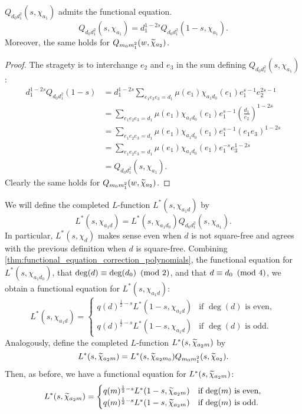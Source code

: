 \documentclass[12pt,reqno,oneside]{amsart}
\begin{document}
    \begin{theorem}\label{thm:functional_equation_correction_polynomials}
        $Q_{d_{0}d_{1}^{2}}(s,\chi_{a_{1}})$ admits the functional equation.
        \[
            Q_{d_{0}d_{1}^{2}}(s,\chi_{a_{1}}) = d_{1}^{1-2s}Q_{d_{0}d_{1}^{2}}(1-s,\chi_{a_{1}}).
        \]
        Moreover, the same holds for $Q_{m_{0}m_{1}^{2}}(w,\widetilde{\chi}_{a_{2}})$.
    \end{theorem}
    \begin{proof}
        The stragety is to interchange $e_{2}$ and $e_{3}$ in the sum defining $Q_{d_{0}d_{1}^{2}}(s,\chi_{a_{1}})$:
        \begin{align*}
            d_{1}^{1-2s}Q_{d_{0}d_{1}^{2}}(1-s) &= d_{1}^{1-2s}\sum_{e_{1}e_{2}e_{3} = d_{1}}\mu(e_{1})\chi_{a_{1}d_{0}}(e_{1})e_{1}^{s-1}e_{2}^{2s-1} \\
            &= \sum_{e_{1}e_{2}e_{3} = d_{1}}\mu(e_{1})\chi_{a_{1}d_{0}}(e_{1})e_{1}^{s-1}\left(\frac{d_{1}}{e_{2}}\right)^{1-2s} \\
            &= \sum_{e_{1}e_{2}e_{3} = d_{1}}\mu(e_{1})\chi_{a_{1}d_{0}}(e_{1})e_{1}^{s-1}(e_{1}e_{3})^{1-2s} \\
            &= \sum_{e_{1}e_{2}e_{3} = d_{1}}\mu(e_{1})\chi_{a_{1}d_{0}}(e_{1})e_{1}^{-s}e_{3}^{1-2s} \\
            &= Q_{d_{0}d_{1}^{2}}(s,\chi_{a_{1}}).
        \end{align*}
        Clearly the same holds for $Q_{m_{0}m_{1}^{2}}(w,\widetilde{\chi}_{a_{2}})$.
    \end{proof}

    We will define the completed $L$-function $L^{\ast}(s,\chi_{a_{1}d})$ by
    \[
        L^{\ast}(s,\chi_{a_{1}d}) = L^{\ast}(s,\chi_{a_{1}d_{0}})Q_{d_{0}d_{1}^{2}}(s,\chi_{a_{1}}).
    \]
    In particular, $L^{\ast}(s,\chi_{d})$ makes sense even when $d$ is not square-free and agrees with the previous definition when $d$ is square-free.
    Combining \cref{thm:functional_equation_correction_polynomials}, the functional equation for $L^{\ast}(s,\chi_{a_{1}d_{0}})$, that $\deg(d) \equiv \deg(d_{0}) \ \left(\text{mod }2\right)$, and that $d \equiv d_{0} \ \left(\text{mod }4\right)$, we obtain a functional equation for $L^{\ast}(s,\chi_{a_{1}d})$:
    \[
        L^{\ast}(s,\chi_{a_{1}d}) = \begin{cases} q(d)^{\frac{1}{2}-s}L^{\ast}(1-s,\chi_{a_{1}d}) & \text{if $\deg(d)$ is even}, \\ q(d)^{\frac{1}{2}-s}L^{\ast}(1-s,\chi_{a_{1}d}) & \text{if $\deg(d)$ is odd}. \end{cases}
    \]
    Analogously, define the completed $L$-function $L^{\ast}(s,\widetilde{\chi}_{a_{2}m})$ by
    \[
        L^{\ast}(s,\widetilde{\chi}_{a_{2}m}) = L^{\ast}(s,\widetilde{\chi}_{a_{2}m_{0}})Q_{m_{0}m_{1}^{2}}(s,\widetilde{\chi}_{a_{2}}).
    \]
    Then, as before, we have a functional equation for $L^{\ast}(s,\widetilde{\chi}_{a_{2}m})$:
    \[
        L^{\ast}(s,\widetilde{\chi}_{a_{2}m}) = \begin{cases} q(m)^{\frac{1}{2}-s}L^{\ast}(1-s,\widetilde{\chi}_{a_{2}m}) & \text{if $\deg(m)$ is even}, \\ q(m)^{\frac{1}{2}-s}L^{\ast}(1-s,\widetilde{\chi}_{a_{2}m}) & \text{if $\deg(m)$ is odd}. \end{cases}
    \]
\end{document}
